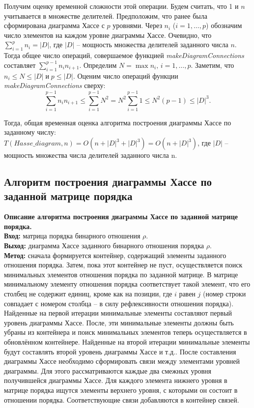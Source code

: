 \documentclass[spec, och, otchet, hidelinks]{SCWorks}
\begin{document}
\par Получим оценку временной сложности этой операции. Будем считать, что 1 и
$n$ учитывается в множестве делителей. Предположим, что ранее была сформирована
диаграмма Хассе с $p$ уровнями. Через $n_i$ ($i = 1,\dots, p$) обозначим число элементов на каждом
уровне диаграммы Хассе. Очевидно, что $ \sum_{i = 1}^{p} n_i = |D| $, где
$|D|$ -- мощность множества делителей заданного числа $n$. Тогда общее число
операций, совершаемое функцией \textit{makeDiagramConnections} составляет $
\sum_{i = 1}^{p - 1} n_i n_{i + 1}$. Определим $N = \max n_i, \, i = 1,\dots,p
$. Заметим, что $n_i \leq N \leq |D| \; \text{и} \; p \leq |D|$. Оценим число операций
функции \textit{makeDiagramConnections} сверху: $$ \sum_{i = 1}^{p -
  1}n_in_{i + 1} \leq \sum_{i = 1}^{p - 1}N^2 = N^2 \sum_{i = 1}^{p - 1} 1 \leq
N^2 (p - 1) \leq |D|^3.$$

\par Тогда, общая временная оценка алгоритма построения диаграммы Хассе по
заданному числу: $T(Hasse\_diagram, n) = O(n + |D|^3 + |D|^3) = O(n + |D|^3)$,
где $|D|$ -- мощность множества числа делителей заданного числа n.

\newpage

\subsection{Алгоритм построения диаграммы Хассе по заданной матрице порядка}

\par \textbf{Описание алгоритма построения диаграммы Хассе по заданной матрице
  порядка.} \\
\textbf{Вход:} матрица порядка бинарного отношения $\rho$. \\
\textbf{Выход:} диаграмма Хассе заданного бинарного отношения порядка $\rho$. \\
\textbf{Метод:} сначала формируется контейнер, содержащий элементы заданного отношения
порядка. Затем, пока этот контейнер не пуст, осуществляется поиск минимальных
элементов отношения порядка по заданной матрице. В матрице минимальному элементу
отношения порядка соответствует такой элемент, что его столбец не содержит
единиц, кроме как на позиции, где $i$ равен $j$ (номер строки совпадает с
номером столбца -- в силу рефлексивности отношения порядка). Найденные на первой
итерации минимальные элементы составляют первый уровень диаграммы Хассе. После,
эти минимальные элементы должны быть убраны из контейнера и поиск минимальных
элементов теперь осуществляется в обновлённом контейнере. Найденные на второй
итерации минимальные элементы будут составлять второй уровень диаграммы Хассе и
т.д.. После составления диаграммы Хассе необходимо сформировать связи между
элементами уровней диаграммы. Для этого рассматриваются каждые два смежных
уровня получившейся диаграммы Хассе. Для каждого элемента нижнего уровня в
матрице порядка ищутся элементы верхнего уровня, с которыми он состоит в
отношении порядка. Соответствующие связи добавляются в контейнер связей. \\
\end{document}
